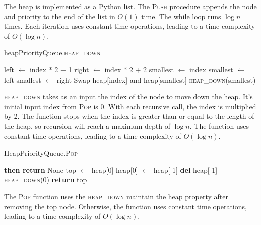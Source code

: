 \documentclass[12pt]{article}
\begin{document}
The heap is implemented as a Python list. The \textsc{Push} procedure appends the
node and priority to the end of the list in $O(1)$ time. The while loop runs $\log{n}$
times. Each iteration uses constant time operations, leading to a time complexity
of $O(\log{n})$.

\begin{algorithm}[H]
    \caption{heapPriorityQueue.\textsc{heap\_down}}
    \begin{algorithmic}[1]
        \State left $\gets$ index * 2 + 1
        \State right $\gets$ index * 2 + 2
        \State smallest $\gets$ index
            \State smallest $\gets$ left
        \EndIf
            \State smallest $\gets$ right
        \EndIf
            \State Swap heap[index] and heap[smallest]
            \State \textsc{heap\_down}(smallest) 
        \EndIf
    \end{algorithmic}
\end{algorithm}

\textsc{heap\_down} takes as an input the index of the node to move down the heap.
It's initial input index from \textsc{Pop} is 0. With each recursive call,
the index is multiplied by 2. The function stops when the index is greater than
or equal to the length of the heap, so recursion will reach a maximum depth of
$\log{n}$. The function uses constant time operations, leading to a time complexity
of $O(\log{n})$.

\begin{algorithm}[H]
    \caption{HeapPriorityQueue.\textsc{Pop}}
    \begin{algorithmic}[1]
            \State \textbf{then return} None
        \EndIf
        \State top $\gets$ heap[0]
        \State heap[0] $\gets$ heap[-1]
        \State \textbf{del} heap[-1]
        \State \textsc{heap\_down}(0) 
        \State \textbf{return} top
    \end{algorithmic}
\end{algorithm}

The \textsc{Pop} function uses the \textsc{heap\_down} maintain the heap property
after removing the top node. Otherwise, the function uses constant time operations,
leading to a time complexity of $O(\log{n})$.
\end{document}
